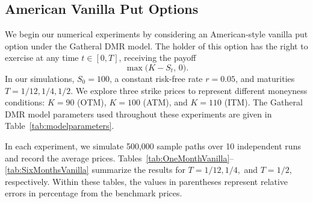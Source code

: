 \documentclass[graybox]{svmult}
\begin{document}
\subsection{American Vanilla Put Options}

We begin our numerical experiments by considering an American-style vanilla put option under the Gatheral DMR model. The holder of this option has the right to exercise at any time $t \in [0, T]$, receiving the payoff
\[
\max\!\bigl(K - S_t,\, 0\bigr).
\]
In our simulations, $S_0 = 100$, a constant risk-free rate $r = 0.05$, and maturities $T = 1/12, 1/4, 1/2$. We explore three strike prices to represent different moneyness conditions: $K = 90$ (OTM), $K = 100$ (ATM), and $K = 110$ (ITM). The Gatheral DMR model parameters used throughout these experiments are given in Table~\ref{tab:modelparameters}.

In each experiment, we simulate 500,000 sample paths over 10 independent runs and record the average prices.  Tables~\ref{tab:OneMonthVanilla}--\ref{tab:SixMonthsVanilla} summarize the results for $T = 1/12, 1/4,$ and $T=1/2$, respectively. Within these tables, the values in parentheses represent relative errors in percentage from the benchmark prices.
\end{document}
